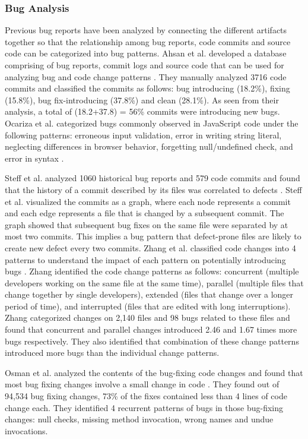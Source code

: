 \documentclass[conference]{IEEEtran}
\begin{document}
\subsubsection{Bug Analysis}
Previous bug reports have been analyzed by connecting the different artifacts together so that the relationship among bug reports, code commits and source code can be categorized into bug patterns. Ahsan et al. developed a database comprising of bug reports, commit logs and source code that can be used for analyzing bug and code change patterns \cite{database_ahsan}. They manually analyzed 3716 code commits and classified the commits as follows: bug introducing (18.2\%), fixing (15.8\%), bug fix-introducing (37.8\%) and clean (28.1\%). As seen from their analysis, a total of (18.2+37.8) = 56\%  commits were introducing new bugs. Ocariza et al. categorized bugs commonly observed in JavaScript code under the following patterns: erroneous input validation, error in writing string literal, neglecting differences in browser behavior, forgetting null/undefined check, and error in syntax \cite{Empirical_Ocariza}.

Steff et al. analyzed 1060 historical bug reports and 579 code commits and found that the history of a commit described by its files was correlated to defects \cite{co_evolution_steff}. Steff et al. visualized the commits as a graph, where each node represents a commit and each edge represents a file that is changed by a subsequent commit. The graph showed that subsequent bug fixes on the same file were separated by at most two commits. This implies a bug pattern that defect-prone files are likely to create new defect every two commits. Zhang et al. classified code changes into 4 patterns to understand the impact of each pattern on potentially introducing bugs \cite{Empirical_Zhang}. Zhang identified the code change patterns as follows: concurrent (multiple developers working on the same file at the same time), parallel (multiple files that change together by single developers), extended (files that change over a longer period of time), and interrupted (files that are edited with long interruptions). Zhang categorized changes on 2,140 files and 98 bugs related to these files and found that concurrent and parallel changes introduced 2.46 and 1.67 times more bugs respectively. They also identified that combination of these change patterns introduced more bugs than the individual change patterns.

Osman et al. analyzed the contents of the bug-fixing code changes and found that most bug fixing changes involve a small change in code \cite{Mining_Osman}. They found out of 94,534 bug fixing changes, 73\% of the fixes contained less than 4 lines of code change each. They identified 4 recurrent patterns of bugs in those bug-fixing changes: null checks, missing method invocation, wrong names and undue invocations.
\end{document}
